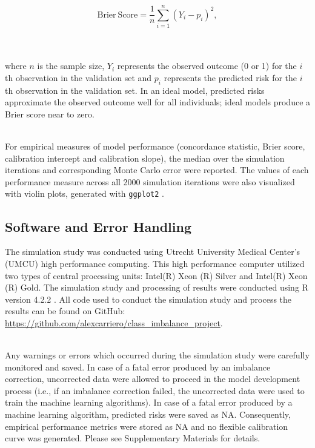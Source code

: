 \documentclass[AMA,STIX1COL,]{WileyNJD-v2}
\begin{document}
\begin{equation}
\mathrm{Brier \ Score} = \frac{1}{n} \sum^{n}_{i = 1} (Y_i - p_i)^2,
\end{equation}\\
\strut \\
where \(n\) is the sample size, \(Y_i\) represents the observed outcome
(0 or 1) for the \(i\)th observation in the validation set and \(p_i\)
represents the predicted risk for the \(i\)th observation in the
validation set. In an ideal model, predicted risks approximate the
observed outcome well for all individuals; ideal models produce a Brier
score near to zero.\\
\strut \\
For empirical measures of model performance (concordance statistic,
Brier score, calibration intercept and calibration slope), the median
over the simulation iterations and corresponding Monte Carlo error were
reported. The values of each performance measure across all 2000
simulation iterations were also visualized with violin plots, generated
with \texttt{ggplot2} \citep{gg}.

\hypertarget{software-and-error-handling}{%
\subsection{Software and Error
Handling}\label{software-and-error-handling}}

The simulation study was conducted using Utrecht University Medical
Center's (UMCU) high performance computing. This high performance
computer utilized two types of central processing units: Intel(R) Xeon
(R) Silver and Intel(R) Xeon (R) Gold. The simulation study and
processing of results were conducted using R version 4.2.2 \citep{r}.
All code used to conduct the simulation study and process the results
can be found on GitHub:
\url{https://github.com/alexcarriero/class_imbalance_project}.\\
\strut \\
Any warnings or errors which occurred during the simulation study were
carefully monitored and saved. In case of a fatal error produced by an
imbalance correction, uncorrected data were allowed to proceed in the
model development process (i.e., if an imbalance correction failed, the
uncorrected data were used to train the machine learning algorithms). In
case of a fatal error produced by a machine learning algorithm,
predicted risks were saved as NA. Consequently, empirical performance
metrics were stored as NA and no flexible calibration curve was
generated. Please see Supplementary Materials for details.
\end{document}

